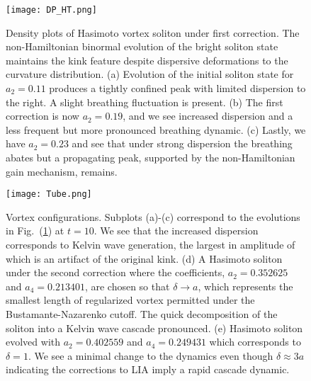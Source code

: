 \documentclass[aps,graphicx,reprint,onecolumn,12pt,tightenlines,longbibliography]{revtex4-1}
\begin{document}
{\begin{figure}
 \texttt{[image: DP\_HT.png]}
\caption{Density plots of Hasimoto vortex soliton under first correction. The non-Hamiltonian binormal evolution of the bright soliton state maintains the kink feature despite dispersive deformations to the curvature distribution. (a) Evolution of the initial soliton state for $a_{2}=0.11$ produces a tightly confined peak with limited dispersion to the right. A slight breathing fluctuation is present. (b) The first correction is now $a_{2}=0.19$, and we see increased dispersion and a less frequent but more pronounced breathing dynamic. (c) Lastly, we have $a_{2}=0.23$ and see that under strong dispersion the breathing abates but a propagating peak, supported by the non-Hamiltonian gain mechanism, remains. }
\label{fig:DPHasimoto transform}
\end{figure}
%
%
\begin{figure}[h]
\texttt{[image: Tube.png]}
\caption{Vortex configurations. Subplots (a)-(c) correspond to the evolutions in Fig.~(\ref{fig:DPHasimoto transform}) at $t=10$. We see that the increased dispersion corresponds to Kelvin wave generation, the largest in amplitude of which is an artifact of the original kink. (d) A Hasimoto soliton under the second correction where the coefficients, $a_{2} = 0.352625$ and  $a_{4}= 0.213401$, are chosen so that $\delta \to a$, which represents the smallest length of regularized vortex permitted under the Bustamante-Nazarenko cutoff. The quick decomposition of the soliton into a Kelvin wave cascade pronounced. (e) Hasimoto soliton evolved with $a_{2} = 0.402559$ and $a_{4}=0.249431$ which corresponds to $\delta =1$. We see a minimal change to the dynamics even though $\delta \approx 3 a$ indicating the corrections to LIA imply a rapid cascade dynamic.}
\label{fig:vortexconfigA2}
\end{figure}
%
}
\end{document}

